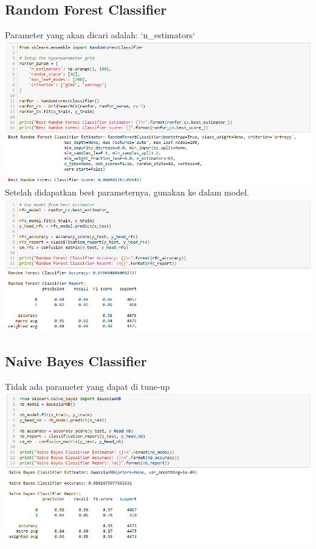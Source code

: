 \documentclass[12pt]{article}
\begin{document}
    \subsection{Random Forest Classifier}
    \newline
    \newline Parameter yang akan dicari adalah: `n\_estimators`
    \newline \includegraphics[scale=0.535]{rfc-tune.png}
    \newline
    \newline Setelah didapatkan best parameternya, gunakan ke dalam model.
    \newline \includegraphics[scale=0.535]{rfc-model.png}
    
    \newpage
    
    \subsection{Naive Bayes Classifier}
    \newline
    \newline Tidak ada parameter yang dapat di tune-up
    \newline \includegraphics[scale=0.535]{nb-model.png}
    
\end{document}
